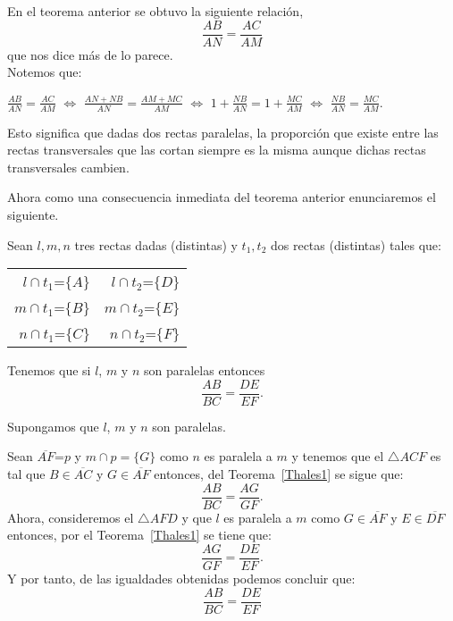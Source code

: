 	
\begin{obs}
En el teorema anterior se obtuvo la siguiente relación, $$\frac{AB}{AN}=\frac{AC}{AM}$$ que nos dice más de lo parece.\\
Notemos que: \\
\begin{center}
$\frac{AB}{AN}=\frac{AC}{AM}$ $\Leftrightarrow$ $\frac{AN+NB}{AN}=\frac{AM+MC}{AM}$ $\Leftrightarrow$ $1+\frac{NB}{AN}= 1+\frac{MC}{AM}$ $\Leftrightarrow$  $\frac{NB}{AN}=\frac{MC}{AM}$.
\end{center}
Esto significa que dadas dos rectas paralelas, la proporción que existe entre las rectas transversales que las cortan siempre es la misma aunque dichas rectas transversales cambien. 
\end{obs}
	
	
Ahora como una consecuencia inmediata del teorema anterior enunciaremos el siguiente.
	
\begin{teo}\label{Thales2} Sean $l, m, n$ tres rectas dadas (distintas) y $t_{1}, t_{2}$ dos rectas (distintas) tales que:
\begin{center}
\begin{tabular}{r r}

$l \cap t_{1}$=$\{A\}$ & $ l \cap t_{2}$=$\{D\}$\\
$m \cap t_{1}$=$\{B\}$ & $ m \cap t_{2}$=$\{E\}$\\
$n \cap t_{1}$=$\{C\}$ & $ n \cap t_{2}$=$\{F\}$\\
	
\end{tabular}
\end{center}
Tenemos que si $l$, $m$ y $n$ son paralelas entonces $$\frac{AB}{BC}=\frac{DE}{EF}.$$
	
\end{teo}
	
\begin{dem}
Supongamos que $l$, $m$ y $n$ son paralelas.
			
Sean $\overline{AF}$=$p$ y $m\cap p=\{G\}$ como $n$ es paralela a $m$ y tenemos que el $\triangle ACF$ es tal que $B\in \overline{AC}$ y $G\in \overline{AF}$ entonces, del Teorema~\ref{Thales1} se sigue que:  $$\frac{AB}{BC}=\frac{AG}{GF}.$$
Ahora, consideremos el $\triangle AFD$ y que $l$ es paralela a $m$ como $G\in \overline{AF}$ y $E\in \overline{DF}$ entonces, por el Teorema~\ref{Thales1} se tiene que: $$\frac{AG}{GF}=\frac{DE}{EF}.$$
Y por tanto, de las igualdades obtenidas podemos concluir que: $$\frac{AB}{BC}=\frac{DE}{EF}$$\\
\end{dem}
			
